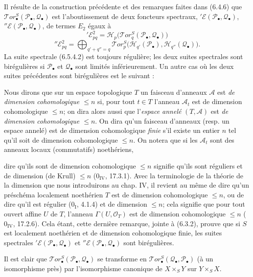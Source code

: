 \begin{env}[6.5.4]
Il résulte de la construction précédente et des remarques faites dans (6.4.6)
que $\mathscr{T}\!or_\bullet^S(\mathscr P_\bullet,\mathscr Q_\bullet)$ est
l'aboutissement de deux foncteurs spectraux,
$'\mathscr E(\mathscr P_\bullet,\mathscr Q_\bullet)$,
$''\mathscr E(\mathscr P_\bullet,\mathscr Q_\bullet)$, de termes $E_2$ égaux à
\[
  '\mathscr E_{pq}^2
  =\mathscr H_p\bigl(\mathscr{T}\!or_q^S
    (\mathscr P_\bullet,\mathscr Q_\bullet)\bigr)
  \tag{6.5.4.1}\label{III.6.5.4.1.fr}
\]
\[
  ''\mathscr E_{pq}^2
  =\bigoplus_{q'+q''=q}
   \mathscr{T}\!or_p^S
   \bigl(\mathscr H_{q'}(\mathscr P_\bullet),
         \mathscr H_{q''}(\mathscr Q_\bullet)\bigr).
  \tag{6.5.4.2}\label{III.6.5.4.2.fr}
\]
La suite spectrale (6.5.4.2) est toujours régulière; les deux suites spectrales
sont birégulières si $\mathscr P_\bullet$ et $\mathscr Q_\bullet$ sont limités
inférieurement. Un autre cas où les deux suites précédentes sont birégulières
est le suivant :
\end{env}

\begin{env}[6.5.5]
Nous dirons que sur un espace topologique $T$ un faisceau d'anneaux
$\mathscr A$ est \emph{de dimension cohomologique $\leqslant n$} si, pour tout
$t\in T$ l'anneau $\mathscr A_t$ est de dimension cohomologique $\leqslant n$;
on dira alors aussi que l'\emph{espace annelé} $(T,\mathscr A)$ est
\emph{de dimension cohomologique $\leqslant n$}. On dira qu'un faisceau
d'anneaux (resp. un espace annelé) est de dimension cohomologique \emph{finie}
s'il existe un entier $n$ tel qu'il soit de dimension cohomologique
$\leqslant n$. On notera que si les $\mathscr A_t$ sont des anneaux locaux
(commutatifs) noethériens,

dire qu'ils sont de dimension cohomologique $\leqslant n$ signifie qu'ils sont
réguliers et de dimension (de Krull) $\leqslant n$ ($0_{\mathrm{IV}}$, 17.3.1).
Avec la terminologie de la théorie de la dimension que nous introduirons au
chap. IV, il revient au même de dire qu'un préschéma localement noethérien $T$
est de dimension cohomologique $\leqslant n$, ou de dire qu'il est régulier
($0_{\mathrm I}$, 4.1.4) et de dimension $\leqslant n$; cela signifie que pour
tout ouvert affine $U$ de $T$, l'anneau $\Gamma(U,\mathscr O_T)$ est de
dimension cohomologique $\leqslant n$ ($0_{\mathrm{IV}}$, 17.2.6). Cela étant,
cette dernière remarque, jointe à (6.3.2), prouve que si $S$ est localement
noethérien et de dimension cohomologique finie, les suites spectrales
$'\mathscr E(\mathscr P_\bullet,\mathscr Q_\bullet)$ et
$''\mathscr E(\mathscr P_\bullet,\mathscr Q_\bullet)$ sont birégulières.

Il est clair que
$\mathscr{T}\!or_\bullet^S(\mathscr P_\bullet,\mathscr Q_\bullet)$ se
transforme en
$\mathscr{T}\!or_\bullet^S(\mathscr Q_\bullet,\mathscr P_\bullet)$ (à un
isomorphisme près) par l'isomorphisme canonique de $X\times_S Y$ sur
$Y\times_S X$.
\end{env}

